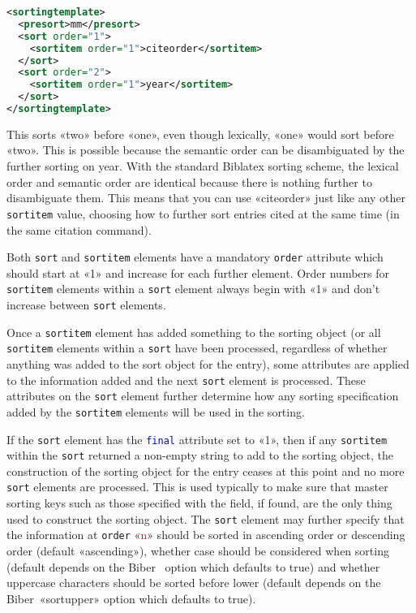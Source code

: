\documentclass{ltxdockit}
\newcommand*{\biber}{Biber\xspace}
\newcommand*{\biblatex}{Biblatex\xspace}
\begin{document}
\begin{lstlisting}[language=xml,escapechar=+,mathescape=true]
<sortingtemplate>
  <presort>mm</presort>
  <sort order="1">
    <sortitem order="1">citeorder</sortitem>
  </sort>
  <sort order="2">
    <sortitem order="1">year</sortitem>
  </sort>
</sortingtemplate>
\end{lstlisting}
%
This sorts «two» before «one», even though lexically, «one» would sort
before «two». This is possible because the semantic order can be
disambiguated by the further sorting on year. With the standard \biblatex
{} sorting scheme, the lexical order and semantic order are identical because
there is nothing further to disambiguate them. This means that you can use
«citeorder» just like any other \texttt{sortitem} value, choosing
how to further sort entries cited at the same time (in the same citation
command).

Both \texttt{sort} and \texttt{sortitem} elements have a mandatory \texttt{order}
attribute which should start at «1» and increase for each further element.
Order numbers for \texttt{sortitem} elements within a \texttt{sort} element
always begin with «1» and don't increase between \texttt{sort} elements.

Once a \texttt{sortitem} element has added something to the sorting object
(or all \texttt{sortitem} elements within a \texttt{sort} have been
processed, regardless of whether anything was added to the sort object for
the entry), some attributes are applied to the information added and the
next \texttt{sort} element is processed. These attributes on the
\texttt{sort} element further determine how any sorting specification added
by the \texttt{sortitem} elements will be used in the sorting.

If the \texttt{sort} element has the \textcolor{blue}{\texttt{final}}
attribute set to «1», then if any \texttt{sortitem} within the
\texttt{sort} returned a non-empty string to add to the sorting object, the
construction of the sorting object for the entry ceases at this point and
no more \texttt{sort} elements are processed. This is used typically to
make sure that master sorting keys such as those specified with the
 field, if found, are the only thing used to construct
the sorting object. The \texttt{sort} element may further specify that the
information at \texttt{order} «\textcolor{red}{n}» should be sorted in ascending order or
descending order (default «ascending»), whether case
should be considered when sorting (default depends on the \biber\
 option which defaults to true)
and whether uppercase characters should be sorted before lower
(default depends on the \biber\ «sortupper» option which defaults to true).
\end{document}
